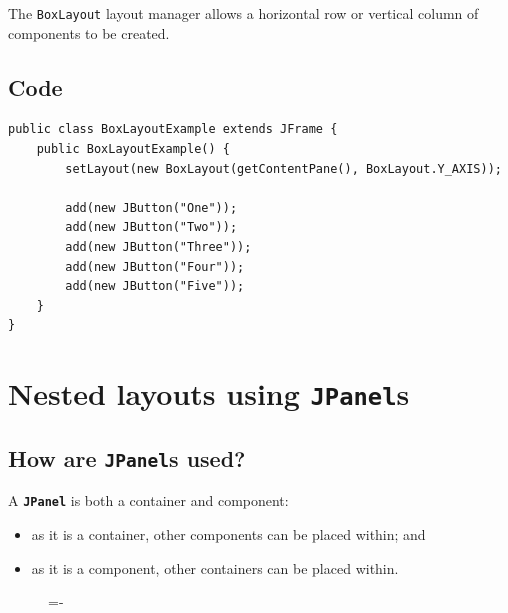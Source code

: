 \documentclass[a4paper]{systems-software}
\begin{document}
The \texttt{BoxLayout} layout manager allows a horizontal row or vertical column of components to be created.


\subsection*{Code}

\begin{lstlisting}[title={A BoxLayout class.}]
public class BoxLayoutExample extends JFrame {
	public BoxLayoutExample() {
		setLayout(new BoxLayout(getContentPane(), BoxLayout.Y_AXIS));

		add(new JButton("One"));
		add(new JButton("Two"));
		add(new JButton("Three"));
		add(new JButton("Four"));
		add(new JButton("Five"));
	}
}
\end{lstlisting}


\section*{Nested layouts using \texttt{JPanel}s}

\subsection*{How are \texttt{JPanel}s used?}

A \textbf{\texttt{JPanel}} is both a container and component:
\begin{itemize}
	\item as it is a container, other components can be placed within; and
	\item as it is a component, other containers can be placed within.
\end{itemize}

\begin{figure}[H]
	\lineskip=-\fboxrule
\end{figure}
\end{document}
